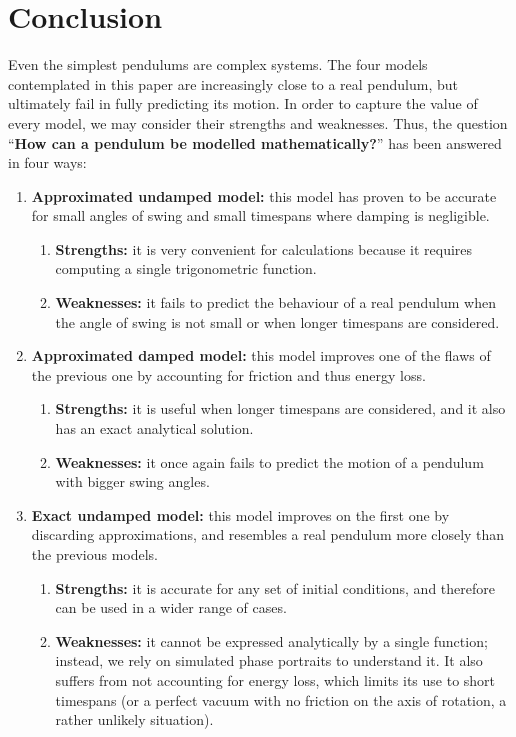 \documentclass[12pt, a4paper, titlepage]{article}
\theoremstyle{definition}
\numberwithin{equation}{section}
\theoremstyle{definition}
\theoremstyle{definition}
\begin{document}
\section{Conclusion}
Even the simplest pendulums are complex systems. The four models contemplated in this paper are increasingly close to a real pendulum, but ultimately fail in fully predicting its motion. In order to capture the value of every model, we may consider their strengths and weaknesses. Thus, the question \enquote{\textbf{How can a pendulum be modelled mathematically?}} has been answered in four ways:
\begin{enumerate}
\item \textbf{Approximated undamped model:} this model has proven to be accurate for small angles of swing and small timespans where damping is negligible.
\begin{enumerate}
\item \textbf{Strengths:} it is very convenient for calculations because it requires computing a single trigonometric function.
\item \textbf{Weaknesses:} it fails to predict the behaviour of a real pendulum when the angle of swing is not small or when longer timespans are considered.
\end{enumerate}
\item \textbf{Approximated damped model:} this model improves one of the flaws of the previous one by accounting for friction and thus energy loss.
\begin{enumerate}
\item \textbf{Strengths:} it is useful when longer timespans are considered, and it also has an exact analytical solution.
\item \textbf{Weaknesses:} it once again fails to predict the motion of a pendulum with bigger swing angles.
\end{enumerate}
\item \textbf{Exact undamped model:} this model improves on the first one by discarding approximations, and resembles a real pendulum more closely than the previous models.
\begin{enumerate}
\item \textbf{Strengths:} it is accurate for any set of initial conditions, and therefore can be used in a wider range of cases.
\item \textbf{Weaknesses:} it cannot be expressed analytically by a single function; instead, we rely on simulated phase portraits to understand it. It also suffers from not accounting for energy loss, which limits its use to short timespans (or a perfect vacuum with no friction on the axis of rotation, a rather unlikely situation).

\end{enumerate}
\end{enumerate}
\end{document}
